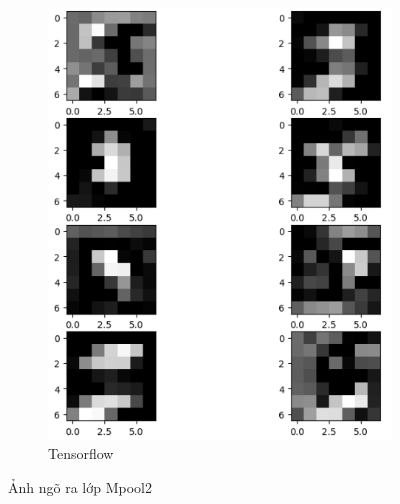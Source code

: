 \begin{figure}[H]
\begin{subfigure}[b]{0.45\linewidth}
        \includegraphics[width=1\linewidth]{Images/cnnm2.png}
        \caption{Tensorflow}
        \label{fig:enter-label}
        \end{subfigure}
    \caption{Ảnh ngõ ra lớp Mpool2}
    \label{fig:main}
\end{figure}


